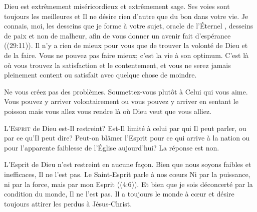 Dieu est extrêmement miséricordieux et extrêmement sage.
 Ses voies sont toujours les meilleures et Il ne désire rien d'autre
 que du bon dans votre vie.
 \Og Je connais, moi, les desseins que je forme à votre sujet,
 \ocadr oracle de l'Éternel \fcadr{}, desseins de paix et non de malheur,
 afin de vous donner un avenir fait d'espérance \Fg{} ((29:11)).
 Il n'y a rien de mieux pour vous que de trouver la volonté de Dieu
 et de la faire. Vous ne pouvez pas faire mieux; c'est la vie à son optimum.
 C'est là où vous trouvez la satisfaction et le contentement,
 et vous ne serez jamais pleinement content ou satisfait
 avec quelque chose de moindre. 

Ne vous créez pas des problèmes. Soumettez-vous
 plutôt à Celui qui vous aime.
 Vous pouvez y arriver volontairement ou vous pouvez y arriver en sentant
 le poisson \ocadr mais vous allez vous rendre
 là où Dieu veut que vous alliez. 

\dvrule






\lettrine{L}{'Esprit} de Dieu est-Il restreint?
 Est-Il limité à celui par qui Il peut parler, ou par ce qu'Il peut dire?
 Peut-on blâmer l'Esprit pour ce qui arrive à la nation
 ou pour l'apparente faiblesse de l'Église aujourd'hui? La réponse est non. 


L'Esprit de Dieu n'est restreint en aucune fa\c{c}on.
 Bien que nous soyons faibles et inefficaces, Il ne l'est pas.
 Le Saint-Esprit parle à nos c\oe{}urs\frcolon{} 
 \Og Ni par la puissance, ni par la force, mais par mon Esprit \Fg{}
 ((4:6)).
 Et bien que je sois déconcerté par la condition du monde, Il ne l'est pas.
 Il a toujours le monde à c\oe{}ur et désire toujours attirer
 les perdus à Jésus-Christ. 

